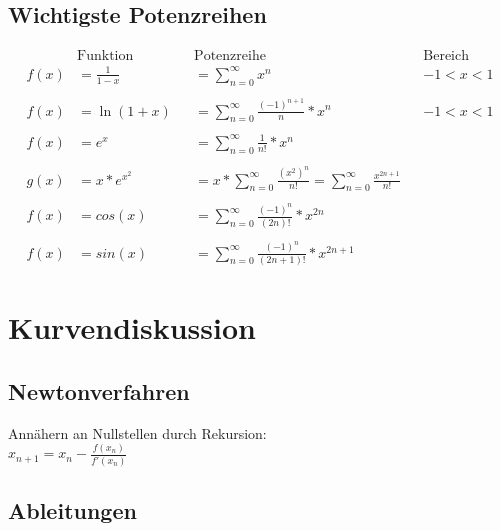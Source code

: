 \documentclass[12pt,a4paper]{article}
\begin{document}
	\subsection{Wichtigste Potenzreihen}
		$$
		\begin{aligned}
		&\text{Funktion }&& \text{Potenzreihe }&& \text{Bereich} \\
		f(x)&= \frac{1}{1-x}&& =\sum^{\infty}_{n=0}x^{n} && -1 <x <1\\\\
		f(x)&= \ln{(1+x)}&&=\sum^{\infty}_{n=0} \frac{(-1)^{n+1}}{n}*x^{n} && -1 <x <1\\\\
		f(x)&=e^{x} &&= \sum^{\infty}_{n=0}{\frac{1}{n!}}*x^{n}\\\\
		g(x)&=x*e^{x^{2}}&&=x*\sum^{\infty}_{n=0} \frac{{(x^{2})^{n}}}{n!} = \sum^{\infty}_{n=0} \frac{x^{2n+1}}{n!}\\\\
		f(x)&=cos(x) &&= \sum^{\infty}_{n=0}{ \frac{(-1)^{n}}{(2n)!}*x^{2n}}\\\\
		f(x)&=sin(x) &&= \sum^{\infty}_{n=0}{ \frac{(-1)^{n}}{(2n+1)!}*x^{2n+1}}
		\end{aligned}
		$$

\section{Kurvendiskussion}
	\subsection{Newtonverfahren}
		Annähern an Nullstellen durch Rekursion:\\
		$x_{n+1} = x_n - \frac{f(x_n)}{f'(x_n)}$
		
	\subsection{Ableitungen}
\end{document}
